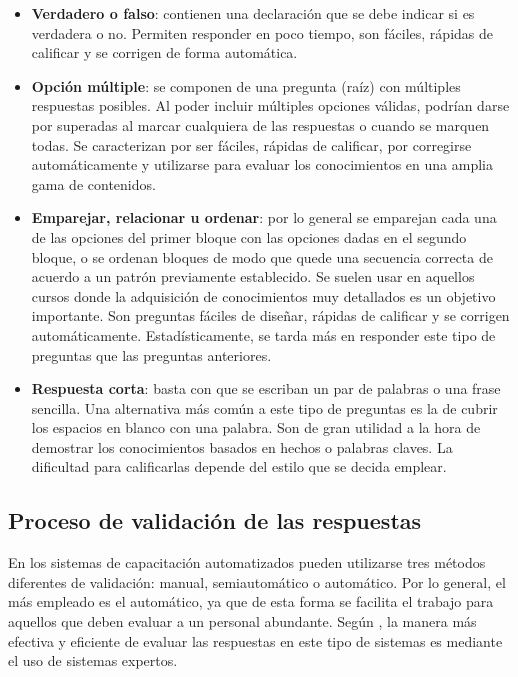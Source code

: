\begin{itemize}
\item \textbf{Verdadero o falso}: contienen una declaración que se debe indicar si es verdadera o no. Permiten responder en poco tiempo, son fáciles, rápidas de calificar y se corrigen de forma automática.
\item \textbf{Opción múltiple}: se componen de una pregunta (raíz) con múltiples respuestas posibles. Al poder incluir múltiples opciones válidas, podrían darse por superadas al marcar cualquiera de las respuestas o cuando se marquen todas. Se caracterizan por ser fáciles, rápidas de calificar, por corregirse automáticamente y utilizarse para evaluar los conocimientos en una amplia gama de contenidos.
\item \textbf{Emparejar, relacionar u ordenar}: por lo general se emparejan cada una de las opciones del primer bloque con las opciones dadas en el segundo bloque, o se ordenan bloques de modo que quede una secuencia correcta de acuerdo a un patrón previamente establecido. Se suelen usar en aquellos cursos donde la adquisición de conocimientos muy detallados es un objetivo importante. Son preguntas fáciles de diseñar, rápidas de calificar y se corrigen automáticamente. Estadísticamente, se tarda más en responder este tipo de preguntas que las preguntas anteriores.
\item \textbf{Respuesta corta}: basta con que se escriban un par de palabras o una frase sencilla. Una alternativa más común a este tipo de preguntas es la de cubrir los espacios en blanco con una palabra. Son de gran utilidad a la hora de demostrar los conocimientos basados en hechos o palabras claves. La dificultad para calificarlas depende del estilo que se decida emplear.
\end{itemize}

\subsection{Proceso de validación de las respuestas}
En los sistemas de capacitación automatizados pueden utilizarse tres métodos diferentes de validación: manual, semiautomático o automático. Por lo general, el más empleado es el automático, ya que de esta forma se facilita el trabajo para aquellos que deben evaluar a un personal abundante. Según \cite{AltyJames1984}, la manera más efectiva y eficiente de evaluar las respuestas en este tipo de sistemas es mediante el uso de sistemas expertos.


